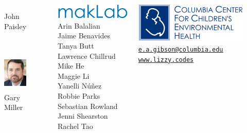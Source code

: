 \documentclass{beamer}
\begin{document}
{\begin{columns}
\begin{figure}
\begin{minipage}[t]{0.45\textwidth}
		\caption{John Paisley}
	\end{minipage} \\
	\vspace{5pt}
	\begin{minipage}[t]{1\textwidth}
		\centering\includegraphics[height=0.7in]{figures/headshots/gary.jpg}  
		\caption{Gary Miller}
	\end{minipage}
\end{figure}


\begin{flushright}
\includegraphics[scale=0.35]{figures/makLab_logo.jpg} \\ 
\vspace{1mm}
\scriptsize
Arin Balalian \\
Jaime Benavides \\
Tanya Butt \\
Lawrence Chillrud \\
Mike He \\
Maggie Li \\
Yanelli N\'{u}\~{n}ez \\
Robbie Parks \\
Sebastian Rowland \\
Jenni Shearston \\
Rachel Tao \\
\end{flushright}

\vspace{-1.75em}

\begin{center}
\includegraphics[scale=0.65]{figures/ccceh_logo.jpg} \\
\vspace{1.5ex}
\tiny
\href{mailto:e.a.gibson@columbia.edu}{\faEnvelopeO \hspace{0.25ex} \tt e.a.gibson@columbia.edu} \\
\href{http://www.lizzy.codes}{\faGlobe \hspace{0.5ex} \tt www.lizzy.codes}
\end{center}


\end{columns}}
\end{document}
